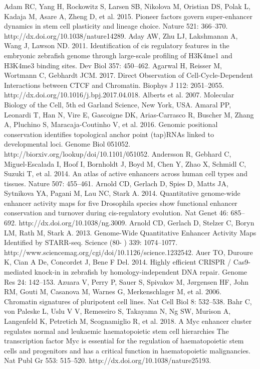 \begin{thebibliography}{1}

	 Adam RC, Yang H, Rockowitz S, Larsen SB, Nikolova M, Oristian DS, Polak L, Kadaja M, Asare A, Zheng D, et al. 2015. Pioneer factors govern super-enhancer dynamics in stem cell plasticity and lineage choice. Nature 521: 366–370. http://dx.doi.org/10.1038/nature14289.
	 Aday AW, Zhu LJ, Lakshmanan A, Wang J, Lawson ND. 2011. Identification of cis regulatory features in the embryonic zebrafish genome through large-scale profiling of H3K4me1 and H3K4me3 binding sites. Dev Biol 357: 450–462.
	 Agarwal H, Reisser M, Wortmann C, Gebhardt JCM. 2017. Direct Observation of Cell-Cycle-Dependent Interactions between CTCF and Chromatin. Biophys J 112: 2051–2055. http://dx.doi.org/10.1016/j.bpj.2017.04.018.
	 Alberts et al. 2007. Molecular Biology of the Cell, 5th ed Garland Science, New York, USA.
	 Amaral PP, Leonardi T, Han N, Vire E, Gascoigne DK, Arias-Carrasco R, Buscher M, Zhang A, Pluchino S, Maracaja-Coutinho V, et al. 2016. Genomic positional conservation identifies topological anchor point (tap)RNAs linked to developmental loci. Genome Biol 051052. http://biorxiv.org/lookup/doi/10.1101/051052.
	 Andersson R, Gebhard C, Miguel-Escalada I, Hoof I, Bornholdt J, Boyd M, Chen Y, Zhao X, Schmidl C, Suzuki T, et al. 2014. An atlas of active enhancers across human cell types and tissues. Nature 507: 455–461.
	 Arnold CD, Gerlach D, Spies D, Matts JA, Sytnikova YA, Pagani M, Lau NC, Stark A. 2014. Quantitative genome-wide enhancer activity maps for five Drosophila species show functional enhancer conservation and turnover during cis-regulatory evolution. Nat Genet 46: 685–692. http://dx.doi.org/10.1038/ng.3009.
	 Arnold CD, Gerlach D, Stelzer C, Boryn LM, Rath M, Stark A. 2013. Genome-Wide Quantitative Enhancer Activity Maps Identified by STARR-seq. Science (80- ) 339: 1074–1077. http://www.sciencemag.org/cgi/doi/10.1126/science.1232542.
	 Auer TO, Duroure K, Cian A De, Concordet J, Bene F Del. 2014. Highly efficient CRISPR / Cas9-mediated knock-in in zebrafish by homology-independent DNA repair. Genome Res 24: 142–153.
	 Azuara V, Perry P, Sauer S, Spivakov M, Jørgensen HF, John RM, Gouti M, Casanova M, Warnes G, Merkenschlager M, et al. 2006. Chromatin signatures of pluripotent cell lines. Nat Cell Biol 8: 532–538.
	 Bahr C, von Paleske L, Uslu V V, Remeseiro S, Takayama N, Ng SW, Murison A, Langenfeld K, Petretich M, Scognamiglio R, et al. 2018. A Myc enhancer cluster regulates normal and leukaemic haematopoietic stem cell hierarchies The transcription factor Myc is essential for the regulation of haematopoietic stem cells and progenitors and has a critical function in haematopoietic malignancies. Nat Publ Gr 553: 515–520. http://dx.doi.org/10.1038/nature25193.

\end{thebibliography}
